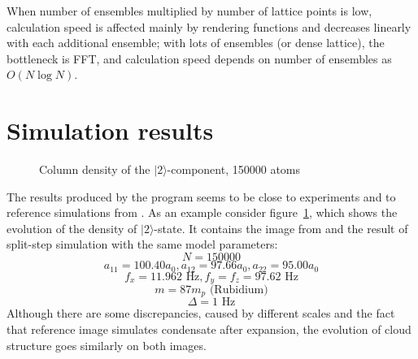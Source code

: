 \documentclass[12pt,notitlepage]{report}
\begin{document}
When number of ensembles multiplied by number of lattice points is low, calculation speed is affected mainly by rendering functions and decreases linearly with each additional ensemble; with lots of ensembles (or dense lattice), the bottleneck is FFT, and calculation speed depends on number of ensembles as $O(N\log{N})$.

\section*{Simulation results}

\begin{figure}
\begin{center}
\qquad
{}
\end{center}
\caption{Column density of the $\vert2\rangle$-component, 150000 atoms}
\label{evolution_vs_reference}
\end{figure}

The results produced by the program seems to be close to experiments and to reference simulations from \cite{anderson-2009-80}. As an example consider figure~\ref{evolution_vs_reference}, which shows the evolution of the density of $\vert2\rangle$-state. It contains the image from \cite{anderson-2009-80} and the result of split-step simulation with the same model parameters:
\[ N = 150000 \]
\[ a_{11} = 100.40 a_0, a_{12} = 97.66 a_0, a_{22} = 95.00 a_0 \]
\[ f_x = 11.962 \textrm{ Hz}, f_y = f_z = 97.62 \textrm{ Hz} \]
\[ m = 87 m_p \textrm{ (Rubidium)}\]
\[ \Delta = 1 \textrm{ Hz} \]
Although there are some discrepancies, caused by different scales and the fact that reference image simulates condensate after expansion, the evolution of cloud structure goes similarly on both images.
\end{document}
